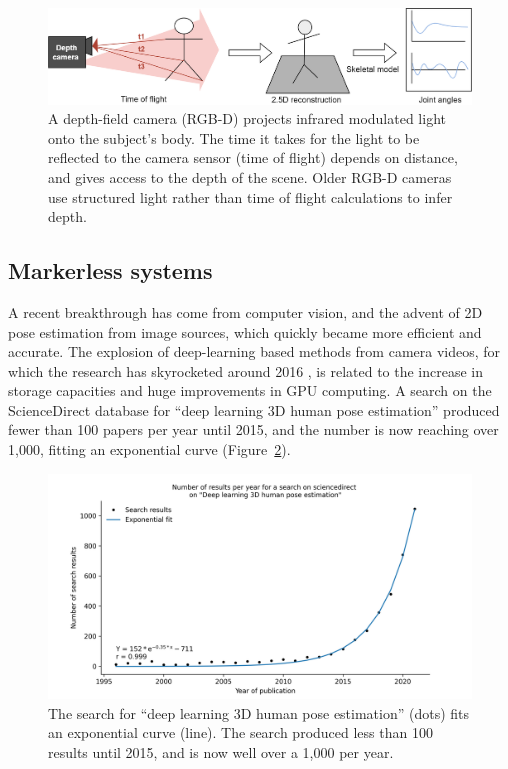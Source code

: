 \begin{figure}[hbtp]
	\centering
	\def\svgwidth{1\columnwidth}
	\fontsize{10pt}{10pt}\selectfont
	\includegraphics[width=\linewidth]{"../Chap1/Figures/Depth.png"}
	\caption{A depth-field camera (RGB-D) projects infrared modulated light onto the subject's body. The time it takes for the light to be reflected to the camera sensor (time of flight) depends on distance, and gives access to the depth of the scene.	Older RGB-D cameras use structured light rather than time of flight calculations to infer depth.}
	\label{fig_depth}
\end{figure}

\FloatBarrier
\subsection{Markerless systems}

A recent breakthrough has come from computer vision, and the advent of 2D pose estimation from image sources, which quickly became more efficient and accurate. The explosion of deep-learning based methods from camera videos, for which the research has skyrocketed around 2016 \cite{Wang2021a}, is related to the increase in storage capacities and huge improvements in GPU computing. A search on the ScienceDirect database for “deep learning 3D human pose estimation” produced fewer than 100 papers per year until 2015, and the number is now reaching over 1,000, fitting an exponential curve (Figure~\ref{fig_exp}).


\begin{figure}[hbtp]
	\centering
	\def\svgwidth{1\columnwidth}
	\fontsize{10pt}{10pt}\selectfont
	\includegraphics[width=\linewidth]{"../Chap1/Figures/Fig_exp.png"}
	\caption{The search for “deep learning 3D human pose estimation” (dots) fits an exponential curve (line). The search produced less than 100 results until 2015, and is now well over a 1,000 per year.}
	\label{fig_exp}
\end{figure}

